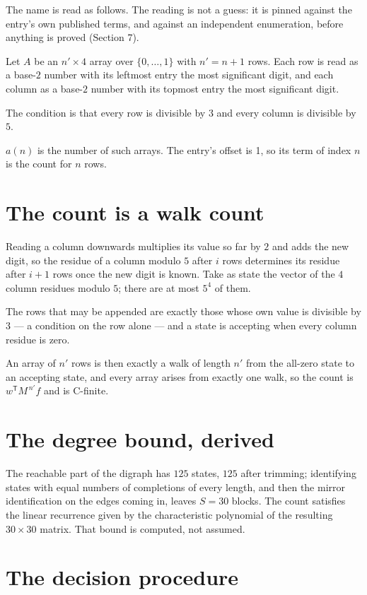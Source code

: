 \documentclass[11pt]{article}
\theoremstyle{definition}
\begin{document}
The name is read as follows. The reading is not a guess: it is pinned against the entry's own published terms, and against an independent enumeration, before anything is proved (Section 7).

Let $A$ be an $n' \times 4$ array over $\{0,\dots,1\}$ with $n' = n + 1$ rows. Each row is read as a base-$2$ number with its leftmost entry the most significant digit, and each column as a base-$2$ number with its topmost entry the most significant digit.

The condition is that every row is divisible by $3$ and every column is divisible by $5$.

$a(n)$ is the number of such arrays. The entry's offset is 1, so its term of index $n$ is the count for $n$ rows.

\section{The count is a walk count}

Reading a column downwards multiplies its value so far by $2$ and adds the new digit, so the residue of a column modulo $5$ after $i$ rows determines its residue after $i+1$ rows once the new digit is known. Take as state the vector of the $4$ column residues modulo $5$; there are at most $5^{4}$ of them.

The rows that may be appended are exactly those whose own value is divisible by $3$ --- a condition on the row alone --- and a state is accepting when every column residue is zero.

An array of $n'$ rows is then exactly a walk of length $n'$ from the all-zero state to an accepting state, and every array arises from exactly one walk, so the count is $w^{\mathsf T}M^{\,n'}f$ and is C-finite.

\section{The degree bound, derived}

The reachable part of the digraph has $125$ states, $125$ after trimming; identifying states with equal numbers of completions of every length, and then the mirror identification on the edges coming in, leaves $S = 30$ blocks. The count satisfies the linear recurrence given by the characteristic polynomial of the resulting $30\times30$ matrix. That bound is computed, not assumed.

\section{The decision procedure}
\end{document}
